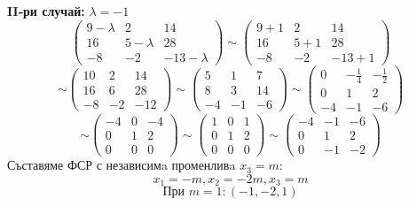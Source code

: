 \documentclass{article}
\begin{document}
\textbf{II-ри случай:} $\lambda=-1$
\[
    \left(\begin{array}{ccc}
            9-\lambda & 2         & 14          \\
            16        & 5-\lambda & 28          \\
            -8        & -2        & -13-\lambda
        \end{array}
    \right)
    \sim\left(\begin{array}{ccc}
            9+1 & 2   & 14    \\
            16  & 5+1 & 28    \\
            -8  & -2  & -13+1
        \end{array}
    \right)
\]
\[
    \sim\left(\begin{array}{ccc}
10 & 2  & 14  \\
16 & 6  & 28  \\
-8 & -2 & -12
\end{array}
\right)
\sim\left(\begin{array}{ccc}
            5  & 1  & 7  \\
            8  & 3  & 14 \\
            -4 & -1 & -6
        \end{array}
    \right)
    \sim\left(\begin{array}{ccc}
            0  & -\frac{1}{4} & -\frac{1}{2} \\
            0  & 1            & 2            \\
            -4 & -1           & -6
        \end{array}
\right)
\]
\[
    \sim\left(\begin{array}{ccc}
            -4 & 0 & -4 \\
            0  & 1 & 2  \\
            0  & 0 & 0
        \end{array}
    \right)
    \sim\left(\begin{array}{ccc}
            1 & 0 & 1 \\
            0 & 1 & 2 \\
            0 & 0 & 0
        \end{array}
    \right)
\sim\left(\begin{array}{ccc}
    -4 & -1 & -6 \\
    0  & 1  & 2  \\
    0  & -1 & -2
\end{array}
\right)
\]
Съставяме ФСР с независимa променливa $x_3=m$:
\[
    x_1=-m, x_2=-2m, x_3=m
\]
\[
    \text{При } m=1: (-1, -2, 1)
\]
\end{document}
